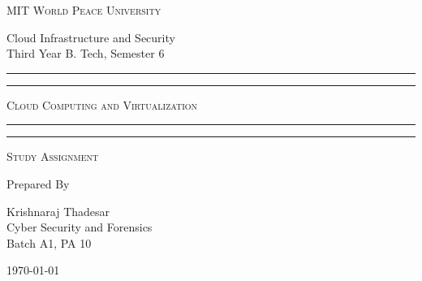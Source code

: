\documentclass[11pt]{article}
\begin{document}
\begin{titlepage}
    \centering


    \huge\textsc{
        MIT World Peace University
    }\\

    \vspace{0.75\baselineskip} %

    \LARGE{
        Cloud Infrastructure and Security\\
        Third Year B. Tech, Semester 6
    }

    \vfill %


    \rule{\textwidth}{1.6pt}\vspace*{-\baselineskip}\vspace*{2pt}
    \rule{\textwidth}{0.6pt}
    \vspace{0.75\baselineskip} %



    \huge{\textsc{
            Cloud Computing and Virtualization
        }} \\



    \vspace{0.5\baselineskip} %
    \rule{\textwidth}{0.6pt}\vspace*{-\baselineskip}\vspace*{2.8pt}
    \rule{\textwidth}{1.6pt}

    \vspace{1\baselineskip} %


    \LARGE\textsc{
        Study Assignment
    } %
    \vfill


    Prepared By
    \vspace{0.5\baselineskip} %

    \Large{
        Krishnaraj Thadesar \\
        Cyber Security and Forensics\\
        Batch A1, PA 10
    }


    \vspace{0.5\baselineskip} %
    \today

\end{titlepage}
\end{document}
